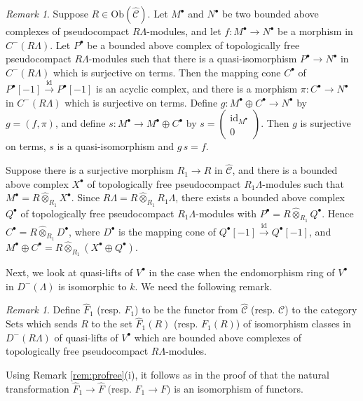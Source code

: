 \documentclass{amsart}
\theoremstyle{plain}
\theoremstyle{definition}
\theoremstyle{remark}
\newtheorem{rem}[thm]{Remark}
\begin{document}
\begin{rem}
\label{rem:Remark5.2}
Suppose $R\in\mathrm{Ob}(\hat{\mathcal{C}})$. Let $M^\bullet$ and $N^\bullet$ be
two bounded above complexes of pseudocompact $R\Lambda$-modules, and
let $f:M^\bullet\to N^\bullet$ be a morphism in $C^-(R\Lambda)$. 
Let $P^\bullet$ be a bounded above complex  of topologically free pseudocompact
$R\Lambda$-modules such that there is a quasi-isomorphism
$P^\bullet \to N^\bullet$ in $C^-(R\Lambda)$
which is surjective on terms. Then
the mapping cone $C^\bullet$ of  $P^\bullet[-1] \xrightarrow{\mathrm{id}} P^\bullet[-1]$
is an acyclic complex, and there is a morphism $\pi: C^\bullet\to N^\bullet$ 
in $C^-(R\Lambda)$ which is
surjective on terms. Define $g:M^\bullet\oplus C^\bullet\to N^\bullet$ by $g=(f,\pi)$, and 
define $s:M^\bullet\to M^\bullet\oplus C^\bullet$ by $s=\left(\begin{array}{c}\mathrm{id}_{
M^\bullet}\\0
\end{array}\right)$. Then $g$ is surjective on terms, $s$ is a quasi-isomorphism and $g\,s=f$.

Suppose there is a surjective morphism $R_1\to R$ in $\hat{\mathcal{C}}$, 
and there is a bounded above complex
$X^\bullet$ of topologically free pseudocompact $R_1\Lambda$-modules such that $M^\bullet=
R\hat{\otimes}_{R_1}X^\bullet$. Since $R\Lambda=R\hat{\otimes}_{R_1}R_1\Lambda$, there exists
a bounded above complex $Q^\bullet$ of topologically free pseudocompact
$R_1\Lambda$-modules with
$P^\bullet=R\hat{\otimes}_{R_1}Q^\bullet$. Hence $C^\bullet=R\hat{\otimes}_{R_1}D^\bullet$,
where $D^\bullet$ is the mapping cone of $Q^\bullet[-1] \xrightarrow{\mathrm{id}} Q^\bullet[-1]$, and $M^\bullet\oplus C^\bullet=R\hat{\otimes}_{R_1}(X^\bullet\oplus Q^\bullet)$.
\end{rem}

Next, we look at quasi-lifts of $V^\bullet$ in the case when  the endomorphism ring of $V^\bullet$ 
in $D^-(\Lambda)$ is isomorphic to $k$. We  need the following remark.

\begin{rem}
\label{rem:Lemma4.2}
Define $\hat{F}_1$ (resp. $F_1$) to be the functor from
$\hat{\mathcal{C}}$ (resp. $\mathcal{C}$) to the category $\mathrm{Sets}$
which sends $R$ to the set $\hat{F}_1(R)$ (resp.
$F_1(R)$) of isomorphism classes in $D^-(R\Lambda)$ of quasi-lifts of $V^\bullet$
which are bounded  above complexes of topologically free pseudocompact $R\Lambda$-modules.

Using Remark \ref{rem:profree}(i), it follows as in the proof of \cite[Lemma 4.2]{bcderived} that the 
natural transformation $\hat{F}_1\to \hat{F}$ $($resp.
$F_1 \to F${}$)$ is an isomorphism of functors.
\end{rem}
\end{document}
